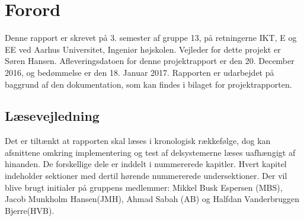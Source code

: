 \chapter{Forord}
Denne rapport er skrevet på 3. semester af gruppe 13, på retningerne IKT, E og EE ved Aarhus Universitet, Ingeniør højskolen. 
Vejleder for dette projekt er Søren Hansen. Afleveringsdatoen for denne projektrapport er den 20. December 2016, og bedømmelse er den 18. Januar 2017.
Rapporten er udarbejdet på baggrund af den dokumentation, som kan findes i bilaget for projektrapporten.

\section{Læsevejledning}
Det er tiltænkt at rapporten skal læses i kronologisk rækkefølge, dog kan afsnittene omkring implementering og test af delsystemerne læses
uafhængigt af hinanden. De forskellige dele er inddelt i nummererede kapitler. Hvert kapitel indeholder sektioner med dertil hørende nummererede undersektioner.
Der vil blive brugt initialer på gruppens medlemmer: Mikkel Busk Espersen (MBS), Jacob Munkholm Hansen(JMH), Ahmad Sabah (AB) og Halfdan Vanderbruggen Bjerre(HVB).

       